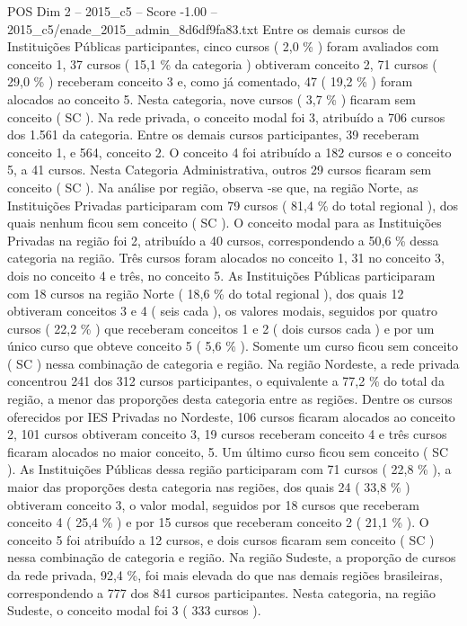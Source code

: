 \begin{textsample}{POS Dim 2 – 2015\_c5 – Score -1.00 – 2015\_c5/enade\_2015\_admin\_8d6df9fa83.txt}
Entre os demais cursos de Instituições Públicas participantes, cinco cursos ( 2,0 \% ) foram avaliados com conceito 1, 37 cursos ( 15,1 \% da categoria ) obtiveram conceito 2, 71 cursos ( 29,0 \% ) receberam conceito 3 e, como já comentado, 47 ( 19,2 \% ) foram alocados ao conceito 5.
Nesta categoria, nove cursos ( 3,7 \% ) ficaram sem conceito ( SC ).
Na rede privada, o conceito modal foi 3, atribuído a 706 cursos dos 1.561 da categoria.
Entre os demais cursos participantes, 39 receberam conceito 1, e 564, conceito 2.
O conceito 4 foi atribuído a 182 cursos e o conceito 5, a 41 cursos.
Nesta Categoria Administrativa, outros 29 cursos ficaram sem conceito ( SC ).
Na análise por região, observa -se que, na região Norte, as Instituições Privadas participaram com 79 cursos ( 81,4 \% do total regional ), dos quais nenhum ficou sem conceito ( SC ).
O conceito modal para as Instituições Privadas na região foi 2, atribuído a 40 cursos, correspondendo a 50,6 \% dessa categoria na região.
Três cursos foram alocados no conceito 1, 31 no conceito 3, dois no conceito 4 e três, no conceito 5.
As Instituições Públicas participaram com 18 cursos na região Norte ( 18,6 \% do total regional ), dos quais 12 obtiveram conceitos 3 e 4 ( seis cada ), os valores modais, seguidos por quatro cursos ( 22,2 \% ) que receberam conceitos 1 e 2 ( dois cursos cada ) e por um único curso que obteve conceito 5 ( 5,6 \% ).
Somente um curso ficou sem conceito ( SC ) nessa combinação de categoria e região.
Na região Nordeste, a rede privada concentrou 241 dos 312 cursos participantes, o equivalente a 77,2 \% do total da região, a menor das proporções desta categoria entre as regiões.
Dentre os cursos oferecidos por IES Privadas no Nordeste, 106 cursos ficaram alocados ao conceito 2, 101 cursos obtiveram conceito 3, 19 cursos receberam conceito 4 e três cursos ficaram alocados no maior conceito, 5.
Um último curso ficou sem conceito ( SC ).
As Instituições Públicas dessa região participaram com 71 cursos ( 22,8 \% ), a maior das proporções desta categoria nas regiões, dos quais 24 ( 33,8 \% ) obtiveram conceito 3, o valor modal, seguidos por 18 cursos que receberam conceito 4 ( 25,4 \% ) e por 15 cursos que receberam conceito 2 ( 21,1 \% ).
O conceito 5 foi atribuído a 12 cursos, e dois cursos ficaram sem conceito ( SC ) nessa combinação de categoria e região.
Na região Sudeste, a proporção de cursos da rede privada, 92,4 \%, foi mais elevada do que nas demais regiões brasileiras, correspondendo a 777 dos 841 cursos participantes.
Nesta categoria, na região Sudeste, o conceito modal foi 3 ( 333 cursos ).

\end{textsample}
